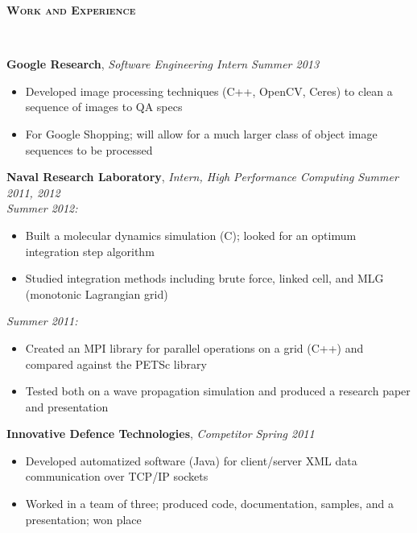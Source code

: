 \documentclass{article}
\newenvironment{changemargin}[2]{%
  \begin{list}{}{%
    \setlength{\topsep}{0pt}%
    \setlength{\leftmargin}{#1}%
    \setlength{\rightmargin}{#2}%
    \setlength{\listparindent}{\parindent}%
    \setlength{\itemindent}{\parindent}%
    \setlength{\parsep}{\parskip}%
  }%
  \item[]}{\end{list}
}
\newcommand{\lineover}{
	\begin{changemargin}{-0.05in}{-0.05in}
		\vspace*{-8pt}
		\hrulefill \\
		\vspace*{-2pt}
	\end{changemargin}
}
\newcommand{\header}[1]{
	\begin{changemargin}{-0.5in}{-0.5in}
		{\large \textbf{\scshape{#1}}}\\
  	\lineover
	\end{changemargin}
}
\newenvironment{body} {
	\vspace*{-16pt}
	\begin{changemargin}{-0.25in}{-0.5in}
  }	
	{\end{changemargin}
}
\begin{document}
\smallskip


\header{Work and Experience}

\begin{body}
	\vspace{14pt}
	\textbf{Google Research}, \emph{Software Engineering Intern} \hfill \emph{Summer 2013}\\
	\begin{itemize}%
		\item Developed image processing techniques (C++, OpenCV, Ceres) to clean a sequence of images to QA specs
		\item For Google Shopping; will allow for a much larger class of object image sequences to be processed
	\end{itemize}

	\medskip

	\textbf{Naval Research Laboratory}, \emph{Intern, High Performance Computing} \hfill \emph{Summer 2011, 2012}\\
	\emph{Summer 2012:}
	\begin{itemize}%
		\item Built a molecular dynamics simulation (C); looked for an optimum integration step algorithm
		\item Studied integration methods including brute force, linked cell, and MLG (monotonic Lagrangian grid)
	\end{itemize}
	
	\emph{Summer 2011:}
	\begin{itemize}%
		\item Created an MPI library for parallel operations on a grid (C++) and compared against the PETSc library
		\item Tested both on a wave propagation simulation and produced a research paper and presentation
	\end{itemize}	
	
	\medskip
	
	\textbf{Innovative Defence Technologies}, \emph{Competitor} \hfill \emph{Spring 2011}\\
	\vspace*{-4pt}
	\begin{itemize}%
		\item Developed automatized software (Java) for client/server XML data communication over TCP/IP sockets
		\item Worked in a team of three; produced code, documentation, samples, and a presentation; won  place
	\end{itemize}
\end{body}
\end{document}
